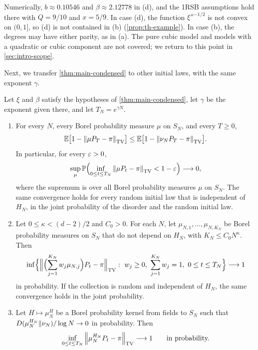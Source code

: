 Numerically, $b\approx0.10546$ and $\beta\approx2.12778$ in (d), and the 1RSB assumptions hold there with $Q=9/10$ and $x=5/9$. In case (d), the function $\xi''^{-1/2}$ is not convex on $(0,1]$, so (d) is not contained in (b) (\cref{prop:th-example}). In case (b), the degrees may have either parity, as in (a). The pure cubic model and models with a quadratic or cubic component are not covered; we return to this point in \cref{sec:intro-scope}.

Next, we transfer \cref{thm:main-condensed} to other initial laws, with the same exponent $\gamma$.

\begin{theorem}\label{thm:main-initial}
Let $\xi$ and $\beta$ satisfy the hypotheses of \cref{thm:main-condensed}, let $\gamma$ be the exponent given there, and let $T_N=e^{\gamma N}$.
\begin{enumerate}[label=(\roman*)]
\item For every $N$, every Borel probability measure $\mu$ on $S_N$, and every $T\ge0$,
\begin{equation}\label{eq:intro-haar}
\mathbb E\bigl[1-\left\lVert\mu P_T-\pi\right\rVert_{\mathrm{TV}}\bigr]\le\mathbb E\bigl[1-\left\lVert\nu_NP_T-\pi\right\rVert_{\mathrm{TV}}\bigr].
\end{equation}
In particular, for every $\varepsilon>0$,
\begin{equation*}
\sup_\mu\mathbb P\Bigl(\inf_{0\le t\le T_N}\left\lVert\mu P_t-\pi\right\rVert_{\mathrm{TV}}<1-\varepsilon\Bigr)\longrightarrow0,
\end{equation*}
where the supremum is over all Borel probability measures $\mu$ on $S_N$. The same convergence holds for every random initial law that is independent of $H_N$, in the joint probability of the disorder and the random initial law.
\item Let $0\le\kappa<(d-2)/2$ and $C_0>0$. For each $N$, let $\mu_{N,1},\dots,\mu_{N,K_N}$ be Borel probability measures on $S_N$ that do not depend on $H_N$, with $K_N\le C_0N^\kappa$. Then
\begin{equation*}
\inf\Bigl\{\Bigl\|\Bigl(\sum_{j=1}^{K_N}w_j\mu_{N,j}\Bigr)P_t-\pi\Bigr\|_{\TV}:\ w_j\ge0,\ \sum_{j=1}^{K_N}w_j=1,\ 0\le t\le T_N\Bigr\}\longrightarrow1
\end{equation*}
in probability. If the collection is random and independent of $H_N$, the same convergence holds in the joint probability.
\item Let $H\mapsto\mu^H_N$ be a Borel probability kernel from fields to $S_N$ such that $D(\mu^{H_N}_N\Vert\nu_N)/\log N\to0$ in probability. Then
\begin{equation*}
\inf_{0\le t\le T_N}\left\lVert\mu^{H_N}_NP_t-\pi\right\rVert_{\mathrm{TV}}\longrightarrow1\qquad\text{in probability.}
\end{equation*}
\end{enumerate}
\end{theorem}

